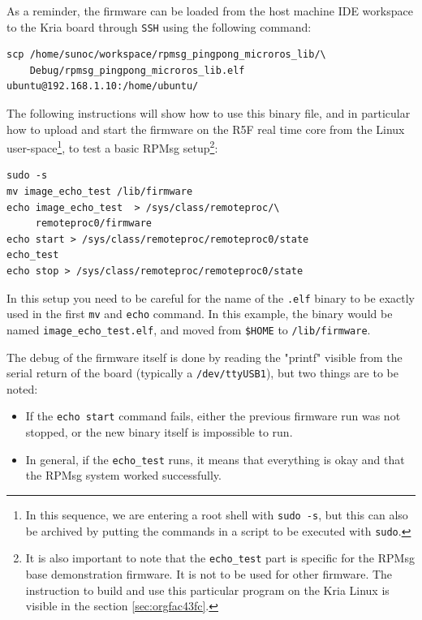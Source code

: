 \documentclass[10pt]{article}
\begin{document}
As a reminder, the firmware can be loaded from the host machine IDE workspace
to the Kria board through \texttt{SSH} using the following command:
\begin{verbatim}
scp /home/sunoc/workspace/rpmsg_pingpong_microros_lib/\
    Debug/rpmsg_pingpong_microros_lib.elf  ubuntu@192.168.1.10:/home/ubuntu/
\end{verbatim}

The following instructions will show how to use this binary file, and
in particular how to upload and start the firmware on the R5F real time core
from the Linux user-space\footnote{In this sequence, we are entering a root shell with \texttt{sudo -s}, but this can
also be archived by putting the commands in a script to be executed with \texttt{sudo}.}, to test a basic RPMsg setup\footnote{It is also important to note that the \texttt{echo\_test} part is specific for the
RPMsg base demonstration firmware. It is not to be used for other firmware.
The instruction to build and use this particular program on the Kria Linux
is visible in the section \ref{sec:orgfac43fc}.}:
\begin{verbatim}
sudo -s
mv image_echo_test /lib/firmware
echo image_echo_test  > /sys/class/remoteproc/\
     remoteproc0/firmware
echo start > /sys/class/remoteproc/remoteproc0/state
echo_test
echo stop > /sys/class/remoteproc/remoteproc0/state
\end{verbatim}

In this setup you need to be careful for the name of the \texttt{.elf} binary to be exactly used
in the first \texttt{mv} and \texttt{echo} command. In this example, the binary would be named
\texttt{image\_echo\_test.elf}, and moved from \texttt{\$HOME} to \texttt{/lib/firmware}.

The debug of the firmware itself is done by reading the "printf" visible from the serial
return of the board (typically a \texttt{/dev/ttyUSB1}), but two things are to be noted:
\begin{itemize}
\item If the \texttt{echo start} command fails, either the previous firmware run was not stopped,
or the new binary itself is impossible to run.
\item In general, if the \texttt{echo\_test} runs, it means that everything is okay and that
the RPMsg system worked successfully.
\end{itemize}
\end{document}
